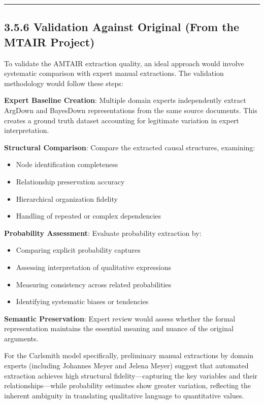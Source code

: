 \documentclass[
  11pt,
  letterpaper,
]{book}
\providecommand{\tightlist}{%
  \setlength{\itemsep}{0pt}\setlength{\parskip}{0pt}}
\begin{document}
\begin{center}\rule{0.5\linewidth}{0.5pt}\end{center}

\newpage{}

\subsection{3.5.6 Validation Against Original (From the MTAIR
Project)}\label{sec-carlsmith-validation}

To validate the AMTAIR extraction quality, an ideal approach would
involve systematic comparison with expert manual extractions. The
validation methodology would follow these steps:

\textbf{Expert Baseline Creation}: Multiple domain experts independently
extract ArgDown and BayesDown representations from the same source
documents. This creates a ground truth dataset accounting for legitimate
variation in expert interpretation.

\textbf{Structural Comparison}: Compare the extracted causal structures,
examining:

\begin{itemize}
\tightlist
\item
  Node identification completeness
\item
  Relationship preservation accuracy
\item
  Hierarchical organization fidelity
\item
  Handling of repeated or complex dependencies
\end{itemize}

\textbf{Probability Assessment}: Evaluate probability extraction by:

\begin{itemize}
\tightlist
\item
  Comparing explicit probability captures
\item
  Assessing interpretation of qualitative expressions
\item
  Measuring consistency across related probabilities
\item
  Identifying systematic biases or tendencies
\end{itemize}

\textbf{Semantic Preservation}: Expert review would assess whether the
formal representation maintains the essential meaning and nuance of the
original arguments.

For the Carlsmith model specifically, preliminary manual extractions by
domain experts (including Johannes Meyer and Jelena Meyer) suggest that
automated extraction achieves high structural fidelity---capturing the
key variables and their relationships---while probability estimates show
greater variation, reflecting the inherent ambiguity in translating
qualitative language to quantitative values.
\end{document}
